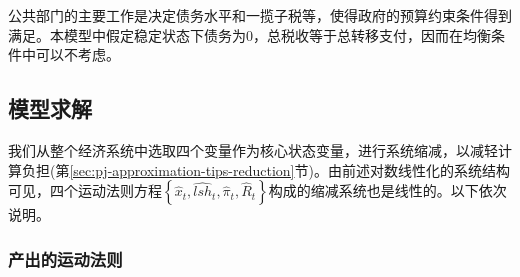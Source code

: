 公共部门的主要工作是决定债务水平和一揽子税等，使得政府的预算约束条件得到满足。本模型中假定稳定状态下债务为$0$，总税收等于总转移支付，因而在均衡条件中可以不考虑。

\subsection{模型求解}
\label{sec:stylized-solution}
我们从整个经济系统中选取四个变量作为核心状态变量，进行系统缩减，以减轻计算负担(第\ref{sec:pj-approximation-tips-reduction}节)。由前述对数线性化的系统结构可见，四个运动法则方程$\left\{ \hat{x}_{t}, \widehat{lsh}_{t}, \hat{\pi}_{t}, \hat{R}_{t} \right\}$构成的缩减系统也是线性的。以下依次说明。

\subsubsection{产出的运动法则}
\label{sec:stylized-solution-x}

